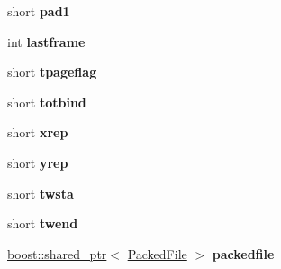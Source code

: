 \begin{DoxyCompactItemize}
\item 
\hypertarget{struct_assimp_1_1_blender_1_1_image_a9d374e48922e064fc2a2952397254966}{short {\bfseries pad1}}\label{struct_assimp_1_1_blender_1_1_image_a9d374e48922e064fc2a2952397254966}

\item 
\hypertarget{struct_assimp_1_1_blender_1_1_image_a0907a58a08cdcd8edc8999247802d93a}{int {\bfseries lastframe}}\label{struct_assimp_1_1_blender_1_1_image_a0907a58a08cdcd8edc8999247802d93a}

\item 
\hypertarget{struct_assimp_1_1_blender_1_1_image_a523edfdcdf7858895b22a1c80bc13828}{short {\bfseries tpageflag}}\label{struct_assimp_1_1_blender_1_1_image_a523edfdcdf7858895b22a1c80bc13828}

\item 
\hypertarget{struct_assimp_1_1_blender_1_1_image_a9b30576a92ce3d64ea6038de40a0247d}{short {\bfseries totbind}}\label{struct_assimp_1_1_blender_1_1_image_a9b30576a92ce3d64ea6038de40a0247d}

\item 
\hypertarget{struct_assimp_1_1_blender_1_1_image_a4b163e9c31ca2ecd393b14fe446ce130}{short {\bfseries xrep}}\label{struct_assimp_1_1_blender_1_1_image_a4b163e9c31ca2ecd393b14fe446ce130}

\item 
\hypertarget{struct_assimp_1_1_blender_1_1_image_affdd53c85e88a8c51c1a071525ea22cb}{short {\bfseries yrep}}\label{struct_assimp_1_1_blender_1_1_image_affdd53c85e88a8c51c1a071525ea22cb}

\item 
\hypertarget{struct_assimp_1_1_blender_1_1_image_a23bd6341e5f5fe4977a0517e2055d60f}{short {\bfseries twsta}}\label{struct_assimp_1_1_blender_1_1_image_a23bd6341e5f5fe4977a0517e2055d60f}

\item 
\hypertarget{struct_assimp_1_1_blender_1_1_image_a24db43d0b5583f7ad48db9ded3aa2fd1}{short {\bfseries twend}}\label{struct_assimp_1_1_blender_1_1_image_a24db43d0b5583f7ad48db9ded3aa2fd1}

\item 
\hypertarget{struct_assimp_1_1_blender_1_1_image_a1dba925e708f63eff0e6fe35d8e46441}{\hyperlink{classboost_1_1shared__ptr}{boost\+::shared\+\_\+ptr}$<$ \hyperlink{struct_assimp_1_1_blender_1_1_packed_file}{Packed\+File} $>$ {\bfseries packedfile}}\label{struct_assimp_1_1_blender_1_1_image_a1dba925e708f63eff0e6fe35d8e46441}


\end{DoxyCompactItemize}
